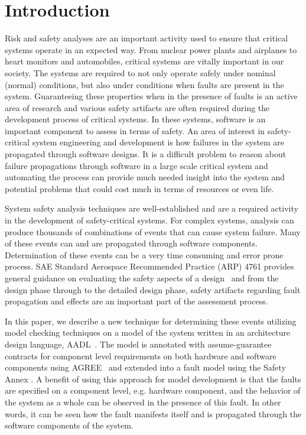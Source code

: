 \section{Introduction}
\label{sec:intro}

Risk and safety analyses are an important activity used to ensure that critical systems operate in an expected way. From nuclear power plants and airplanes to heart monitors and automobiles, critical systems are vitally important in our society. The systems are required to not only operate safely under nominal (normal) conditions, but also under conditions when faults are present in the system. Guaranteeing these properties when in the presence of faults is an active area of research and various safety artifacts are often required during the development process of critical systems. In these systems, software is an important component to assess in terms of safety. An area of interest in safety-critical system engineering and development is how failures in the system are propagated through software designs. It is a difficult problem to reason about failure propagations through software in a large scale critical system and automating the process can provide much needed insight into the system and potential problems that could cost much in terms of resources or even life. 


System safety analysis techniques are well-established and are a required activity in the development of safety-critical systems. For complex systems, analysis can produce thousands of combinations of events that can cause system failure. Many of these events can and are propagated through software components. Determination of these events can be a very time consuming and error prone process. SAE Standard Aerospace Recommended Practice (ARP) 4761 provides general guidance on evaluating the safety aspects of a design~\cite{SAE:ARP4761} and from the design phase through to the detailed design phase, safety artifacts regarding fault propagation and effects are an important part of the assessment process. 

In this paper, we describe a new technique for determining these events utilizing model checking techniques on a model of the system written in an architecture design language, AADL~\cite{AADL_Standard}. The model is annotated with assume-guarantee contracts for component level requirements on both hardware and software components using AGREE~\cite{QFCS15:backes} and extended into a fault model using the Safety Annex \cite{Stewart17:IMBSA,SATechReport}. A benefit of using this approach for model development is that the faults are specified on a component level, e.g. hardware component, and the behavior of the system as a whole can be observed in the presence of this fault. In other words, it can be seen how the fault manifests itself and is propagated through the software components of the system. 

